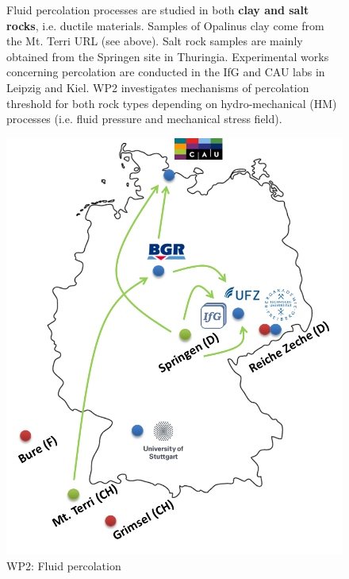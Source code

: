 \begin{figure}[ht!]
\begin{minipage}{0.48\textwidth}
Fluid percolation processes are studied in both \textbf{clay and salt rocks}, i.e. ductile materials. Samples of Opalinus clay come from the Mt. Terri URL (see above). Salt rock samples are mainly obtained from the Springen site in Thuringia. Experimental works concerning percolation are conducted in the IfG and CAU labs in Leipzig and Kiel. WP2 investigates mechanisms of percolation threshold for both rock types depending on hydro-mechanical (HM) processes (i.e. fluid pressure and mechanical stress field).
\end{minipage}
\hfill
\begin{minipage}{0.48\textwidth}
\includegraphics[width=\textwidth]{figures/geomint-wp2.png}
\caption{WP2: Fluid percolation}
\end{minipage}
\end{figure}

